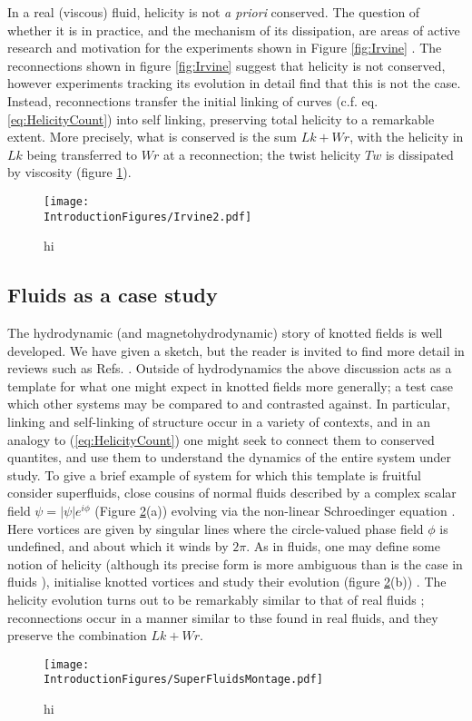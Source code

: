 In a real (viscous) fluid, helicity is not \emph{a priori} conserved. The question of whether it is in practice, and the mechanism of its dissipation, are areas of active research and motivation for the experiments shown in Figure \ref{fig:Irvine} \cite{Klecker}. The reconnections shown in figure \ref{fig:Irvine} suggest that helicity is not conserved, however experiments tracking its evolution in detail \cite{Kleckner,Kleckner,Scheeler} find that this is not the case. Instead, reconnections transfer the initial linking of curves (c.f. eq. \ref{eq:HelicityCount}) into self linking, preserving total helicity to a remarkable extent. More precisely, what is conserved is the sum $Lk +Wr$, with the helicity in $Lk$ being transferred to $Wr$ at a reconnection; the twist helicity $Tw$ is dissipated by viscosity (figure \ref{fig:Irvine2}).
\begin{figure}[htbp]
\centering
\texttt{[image: \\IntroductionFigures/Irvine2.pdf]}
\caption{hi }
\label{fig:Irvine2}
\end{figure}

\subsection{Fluids as a case study}
The hydrodynamic (and magnetohydrodynamic) story of knotted fields is well developed. We have given a sketch, but the reader is invited to find more detail in reviews such as Refs. \cite{Moffat, Irvine}. Outside of hydrodynamics the above discussion acts as a template for what one might expect in knotted fields more generally; a test case which other systems may be compared to and contrasted against. In particular, linking and self-linking of structure occur in a variety of contexts, and in an analogy to (\ref{eq:HelicityCount}) one might seek to connect them to conserved quantites, and use them to understand the dynamics of the entire system under study. To give a brief example of system for which this template is fruitful consider superfluids, close cousins of normal fluids described by a complex scalar field $\psi = |\psi| e^{i \phi}$ (Figure \ref{fig:SuperFluidMontage}(a)) evolving via the non-linear Schroedinger equation \cite{scheeler}. Here vortices are given by singular lines where the circle-valued phase field $\phi$ is undefined, and about which it winds by $2\pi$. As in fluids, one may define some notion of helicity (although its precise form is more ambiguous than is the case in fluids \cite{Salman}), initialise knotted vortices and study their evolution (figure \ref{fig:SuperFluidMontage}(b)) \cite{Scheeler}. The helicity evolution turns out to be remarkably similar to that of real fluids \cite{Scheeler}; reconnections occur in a manner similar to thse found in real fluids, and they preserve the combination $Lk+Wr$.  
\begin{figure}[htbp]
\centering
\texttt{[image: \\IntroductionFigures/SuperFluidsMontage.pdf]}
\caption{hi }
\label{fig:SuperFluidMontage}
\end{figure}

